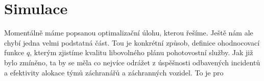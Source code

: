 \clearpage

\section{Simulace}

Momentálně máme popsanou optimalizační úlohu, kterou řešíme. Ještě nám ale chybí jedna velmi podstatná část.
Tou je konkrétní způsob, definice ohodnocovací funkce $q$, kterým zjistíme kvalitu libovolného plánu pohotovostní služby.
Jak již bylo zmíněno, ta by se měla co nejvíce odrážet z úspěšnosti odbavených incidentů a efektivity alokace týmů záchranářů a záchranných vozidel.
To je pro 


